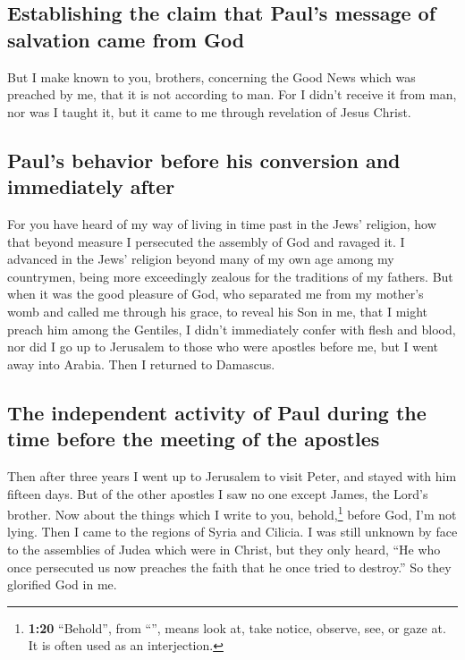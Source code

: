 \hypertarget{establishing-the-claim-that-pauls-message-of-salvation-came-from-god}{%
\subsection{Establishing the claim that Paul's message of salvation came
from
God}\label{establishing-the-claim-that-pauls-message-of-salvation-came-from-god}}

 But I make known to you, brothers, concerning the Good
News which was preached by me, that it is not according to man.
 For I didn't receive it from man, nor was I taught it,
but it came to me through revelation of Jesus Christ.

\hypertarget{pauls-behavior-before-his-conversion-and-immediately-after}{%
\subsection{Paul's behavior before his conversion and immediately
after}\label{pauls-behavior-before-his-conversion-and-immediately-after}}

 For you have heard of my way of living in time past in
the Jews' religion, how that beyond measure I persecuted the assembly of
God and ravaged it.  I advanced in the Jews' religion
beyond many of my own age among my countrymen, being more exceedingly
zealous for the traditions of my fathers.  But when it
was the good pleasure of God, who separated me from my mother's womb and
called me through his grace,  to reveal his Son in me,
that I might preach him among the Gentiles, I didn't immediately confer
with flesh and blood,  nor did I go up to Jerusalem to
those who were apostles before me, but I went away into Arabia. Then I
returned to Damascus.

\hypertarget{the-independent-activity-of-paul-during-the-time-before-the-meeting-of-the-apostles}{%
\subsection{The independent activity of Paul during the time before the
meeting of the
apostles}\label{the-independent-activity-of-paul-during-the-time-before-the-meeting-of-the-apostles}}

 Then after three years I went up to Jerusalem to visit
Peter, and stayed with him fifteen days.  But of the
other apostles I saw no one except James, the Lord's brother.
 Now about the things which I write to you,
behold,\footnote{\textbf{1:20} ``Behold'', from ``'', means
  look at, take notice, observe, see, or gaze at. It is often used as an
  interjection.} before God, I'm not lying.  Then I came
to the regions of Syria and Cilicia.  I was still unknown
by face to the assemblies of Judea which were in Christ, 
but they only heard, ``He who once persecuted us now preaches the faith
that he once tried to destroy.''  So they glorified God
in me.

